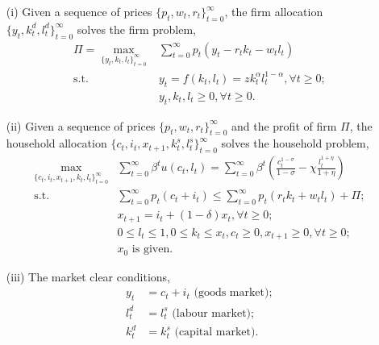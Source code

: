 \documentclass[12pt,notitlepage]{article}%
\numberwithin{equation}{section}
\begin{document}
			\begin{itemize}
			\item[(i)] Given a sequence of prices $\{p_t,w_t,r_t\}_{t=0}^{\infty}$, the firm allocation $\{y_t,k_t^d,l_t^d\}_{t=0}^{\infty}$ solves the firm problem,
			\begin{equation}
			\begin{split}
				\Pi = \max_{\{y_t,k_t,l_t\}_{t=0}^{\infty}}&\sum_{t=0}^{\infty}
				p_t(y_t-r_tk_t-w_tl_t)\\
				\text{s.t.  }&y_t=f(k_t,l_t)=zk_t^{\alpha}l_t^{1-\alpha}, \forall t\geq 0;\\
				&y_t,k_t,l_t\geq 0, \forall t \geq 0.
			\end{split}
			\end{equation}
			
			\item[(ii)] Given a sequence of prices $\{p_t,w_t,r_t\}_{t=0}^{\infty}$ and the profit of firm $\Pi$, the household allocation $\{c_t,i_t,x_{t+1},k_t^s,l_t^s\}_{t=0}^{\infty}$ solves the household problem,
			\begin{equation}
			\begin{split}
				\max_{\{c_t,i_t,x_{t+1},k_t,l_t\}_{t=0}^{\infty}}&\sum_{t=0}^{\infty}
				\beta ^tu(c_t,l_t)=\sum_{t=0}^{\infty}
				\beta ^t(\frac{c_t^{1-\sigma}}{1-\sigma}-\chi \frac{l_t^{1+\eta}}{1+\eta})\\
				\text{s.t.  }& \sum_{t=0}^{\infty}p_t(c_t+i_t)
				\leq\sum_{t=0}^{\infty}p_t(r_tk_t+w_tl_t)+\Pi;\\
				&x_{t+1}=i_t+(1-\delta)x_t, \forall t\geq 0;\\
				&0\leq l_t\leq 1,0\leq k_t\leq x_t, c_t\geq 0, x_{t+1}\geq 0,\forall t \geq 0;\\
				&x_0 \text{ is given.}
			\end{split}
			\end{equation}
			
			\item[(iii)] The market clear conditions,
			\begin{equation*}
			\begin{split}
				y_t&=c_t+i_t	\text{	(goods market)};\\
				l_t^d&=l_t^s	\text{	(labour market)};\\
				k_t^d&=k_t^s 	\text{	(capital market)}.
			\end{split}
			\end{equation*}
			\end{itemize}
		
\end{document}
